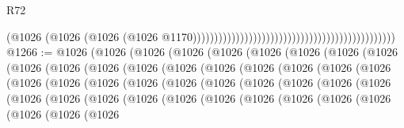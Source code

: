 \begin{lexlean}{R72}
\begin{coremodule}
                                                                                          (@1026
                                                                                            (@1026
                                                                                              (@1026
                                                                                                (@1026
                                                                                                  @1170)))))))))))))))))))))))))))))))))))))))))))))))
@1266 := @1026
    (@1026
      (@1026
        (@1026
          (@1026
            (@1026
              (@1026
                (@1026
                  (@1026
                    (@1026
                      (@1026
                        (@1026
                          (@1026
                            (@1026
                              (@1026
                                (@1026
                                  (@1026
                                    (@1026
                                      (@1026
                                        (@1026
                                          (@1026
                                            (@1026
                                              (@1026
                                                (@1026
                                                  (@1026
                                                    (@1026
                                                      (@1026
                                                        (@1026
                                                          (@1026
                                                            (@1026
                                                              (@1026
                                                                (@1026
                                                                  (@1026
                                                                    (@1026
                                                                      (@1026
                                                                        (@1026
                                                                          (@1026
                                                                            (@1026
                                                                              (@1026
                                                                                (@1026
                                                                                  (@1026
                                                                                    (@1026

\end{coremodule}
\end{lexlean}
